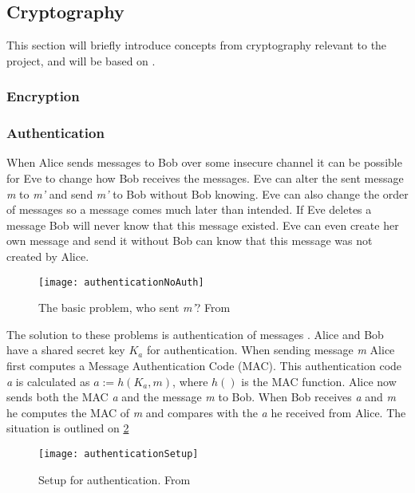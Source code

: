 \subsection{Cryptography}
This section will briefly introduce concepts from cryptography relevant to the project, and will be based on \cite{cryptoenginering}.

\subsubsection{Encryption}

\subsubsection{Authentication}
When Alice sends messages to Bob over some insecure channel it can be possible for Eve to change how Bob receives the messages.
Eve can alter the sent message \emph{m} to \emph{m'} and send \emph{m'} to Bob without Bob knowing.
Eve can also change the order of messages so a message comes much later than intended.
If Eve deletes a message Bob will never know that this message existed.
Eve can even create her own message and send it without Bob can know that this message was not created by Alice.

\begin{figure}[H]
	\centering
	\texttt{[image: authenticationNoAuth]}
	\caption{The basic problem, who sent \emph{m'}? From \citet[p.~52]{cryptoenginering}}
	\label{crypto:noauth}
\end{figure}

The solution to these problems is authentication of messages \citet[p.~52]{cryptoenginering}.
Alice and Bob have a shared secret key $K_a$ for authentication.
When sending message \emph{m} Alice first computes a Message Authentication Code (MAC).
This authentication code \emph{a} is calculated as $a := h(K_a,m)$, where $h()$ is the MAC function.
Alice now sends both the MAC \emph{a} and the message \emph{m} to Bob.
When Bob receives \emph{a} and \emph{m} he computes the MAC of \emph{m} and compares with the \emph{a} he received from Alice.
The situation is outlined on \cref{crypto:authsetup}

\begin{figure}[H]
	\centering
	\texttt{[image: authenticationSetup]}
	\caption{Setup for authentication. From \citet[p.~53]{cryptoenginering}}
	\label{crypto:authsetup}
\end{figure}

